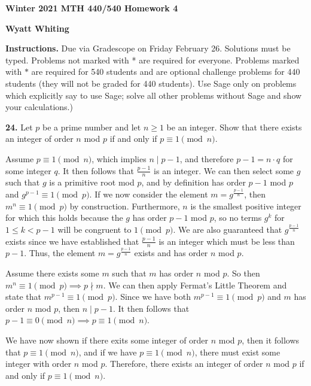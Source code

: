 \documentclass[12pt]{amsart}
\begin{document}
{\bf Winter 2021 MTH 440/540 Homework 4}

{\bf Wyatt Whiting}

\medskip

{\bf Instructions.}  Due via Gradescope on Friday February 26.  Solutions must be typed.  Problems not marked with * are required for everyone.  Problems marked with $*$ are required for 540 students and are optional challenge problems for 440 students  (they will not be graded for 440 students).  Use Sage only on problems which explicitly say to use Sage; solve all other problems without Sage and show your calculations.)

\medskip

{\bf 24.}   Let $p$ be a prime number and let $n\geq1$ be an integer.  Show that there exists an integer of order $n$ mod $p$ if and only if $p\equiv1\pmod{n}$.


\medskip

Assume $p\equiv 1\pmod{n}$, which implies $n\mid p - 1$, and therefore $p - 1 = n\cdot q$ for some integer $q$. It then follows that $\frac{p-1}{n}$ is an integer. We can then select some $g$ such that $g$ is a primitive root mod $p$, and by definition has order $p-1$ mod $p$ and $g^{p-1}\equiv 1\pmod{p}$. If we now consider the element $m = g^{\frac{p-1}{n}}$, then $m^n\equiv 1\pmod{p}$ by construction. Furthermore, $n$ is the smallest positive integer for which this holds because the $g$ has order $p-1$ mod $p$, so no terms $g^k$ for $1\leq k < p - 1$ will be congruent to $1\pmod{p}$. We are also guaranteed that $g^{\frac{p-1}{n}}$ exists since we have established that $\frac{p-1}{n}$ is an integer which must be less than $p-1$. Thus, the element $m=g^{\frac{p-1}{n}}$ exists and has order $n$ mod $p$.

\medskip

Assume there exists some $m$ such that $m$ has order $n$ mod $p$. So then $m^n\equiv 1\pmod{p} \implies p\nmid m$. We can then apply Fermat's Little Theorem and state that $m^{p-1}\equiv 1\pmod{p}$. Since we have both $m^{p-1}\equiv 1\pmod{p}$ and $m$ has order $n$ mod $p$, then $n \mid p - 1$. It then follows that $p-1\equiv 0\pmod{n}\implies p\equiv 1\pmod{n}$.

\smallskip

We have now shown if there exits some integer of order $n$ mod $p$, then it follows that $p \equiv 1\pmod{n}$, and if we have $p \equiv 1\pmod{n}$, there must exist some integer with order $n$ mod $p$. Therefore, there exists an integer of order $n$ mod $p$ if and only if $p \equiv 1\pmod{n}$.
\end{document}
